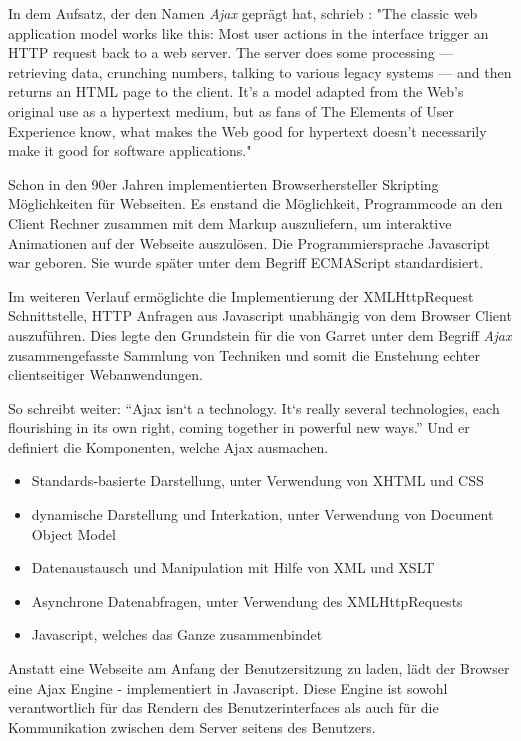 In dem Aufsatz, der den Namen \emph{Ajax} geprägt hat, schrieb \cite{Garrett:2005}: "The classic web application model works like this: Most user actions in the interface trigger an HTTP request back to a web server. The server does some processing — retrieving data, crunching numbers, talking to various legacy systems — and then returns an HTML page to the client. It’s a model adapted from the Web’s original use as a hypertext medium, but as fans of The Elements of User Experience know, what makes the Web good for hypertext doesn’t necessarily make it good for software applications."

Schon in den 90er Jahren implementierten Browserhersteller Skripting Möglichkeiten für Webseiten. Es enstand die Möglichkeit, Programmcode an den Client Rechner zusammen mit dem Markup auszuliefern, um interaktive Animationen auf der Webseite auszulösen. Die Programmiersprache Javascript war geboren. Sie wurde später unter dem Begriff ECMAScript standardisiert.

Im weiteren Verlauf ermöglichte die Implementierung der XMLHttpRequest Schnittstelle, HTTP Anfragen aus Javascript unabhängig von dem Browser Client auszuführen. Dies legte den Grundstein für die von Garret unter dem Begriff \emph{Ajax} zusammengefasste Sammlung von Techniken und somit die Enstehung echter clientseitiger Webanwendungen.

So schreibt \cite{Garrett:2005} weiter: \enquote{Ajax isn`t a technology. It`s really several technologies, each flourishing in its own right, coming together in powerful new ways.} Und er definiert die Komponenten, welche Ajax ausmachen.

\begin{itemize}
\item Standards-basierte Darstellung, unter Verwendung von XHTML und CSS
\item dynamische Darstellung und Interkation, unter Verwendung von Document Object Model
\item Datenaustausch und Manipulation mit Hilfe von XML und XSLT
\item Asynchrone Datenabfragen, unter Verwendung des XMLHttpRequests
\item Javascript, welches das Ganze zusammenbindet
\end{itemize}

Anstatt eine Webseite am Anfang der Benutzersitzung zu laden, lädt der Browser eine Ajax Engine - implementiert in Javascript. Diese Engine ist sowohl verantwortlich für das Rendern des Benutzerinterfaces als auch für die Kommunikation zwischen dem Server seitens des Benutzers.

